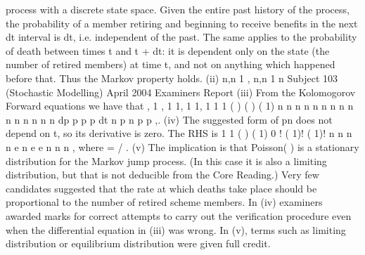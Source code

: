 process with a discrete state space.
Given the entire past history of the process, the probability of a member
retiring and beginning to receive benefits in the next dt interval is dt, i.e.
independent of the past. The same applies to the probability of death between
times t and t + dt: it is dependent only on the state (the number of retired
members) at time t, and not on anything which happened before that. Thus the
Markov property holds.
(ii) n,n 1 , n,n 1 n
Subject 103 (Stochastic Modelling) April 2004 Examiners Report
(iii) From the Kolomogorov Forward equations we have that
, 1 , 1 1, 1 1, 1
1 1
( )
( ) ( 1)
n
n n n n n n n n n n n
n n n
dp
p p p
dt
n p n p p
,.
(iv) The suggested form of pn does not depend on t, so its derivative is zero. The
RHS is
1 1
( ) ( 1) 0
! ( 1)! ( 1)!
n n n
n e n e e
n n n
,
where = / .
(v) The implication is that Poisson( ) is a stationary distribution for the Markov
jump process. (In this case it is also a limiting distribution, but that is not
deducible from the Core Reading.)
Very few candidates suggested that the rate at which deaths take place should be
proportional to the number of retired scheme members.
In (iv) examiners awarded marks for correct attempts to carry out the verification procedure
even when the differential equation in (iii) was wrong.
In (v), terms such as limiting distribution or equilibrium distribution were given full
credit.
